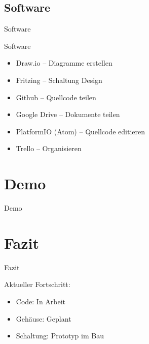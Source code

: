 \documentclass[mathserif,9pt]{beamer}
\begin{document}
    \subsection{Software}
    \begin{frame}{Software}
        \begin{block}{Software}
            \begin{itemize}
                \item Draw.io -- Diagramme erstellen
                \item Fritzing -- Schaltung Design
                \item Github -- Quellcode teilen
                \item Google Drive -- Dokumente teilen
                \item PlatformIO (Atom) -- Quellcode editieren
                \item Trello -- Organisieren
            \end{itemize}
        \end{block}
    \end{frame}
    \section{Demo}
    \begin{frame}
        \begin{block}{}
            \centering
            {\fontsize{100}{120}\selectfont Demo}
        \end{block}
    \end{frame}

    \section{Fazit}
    \begin{frame}
        \begin{block}{Fazit}
            \begin{block}{Aktueller Fortschritt:}
                \begin{itemize}{}
                    \item Code: In Arbeit
                    \item Gehäuse: Geplant
                    \item Schaltung: Prototyp im Bau
                \end{itemize}
            \end{block}
        \end{block}
    \end{frame}
\end{document}
